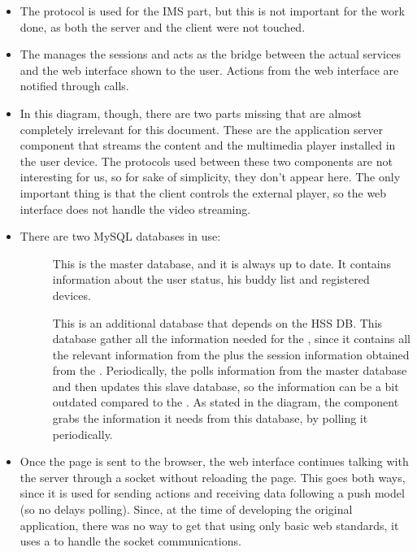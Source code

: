 \begin{itemize}
  \item The  protocol is used for the IMS part, but this is not important for the work done, as both the server and the client were not touched.
  \item The  manages the sessions and acts as the bridge between the actual services and the web interface shown to the user.
  Actions from the web interface are notified through  calls.
  \item In this diagram, though, there are two parts missing that are almost completely irrelevant for this document.
  These are the application server component that streams the content and the multimedia player installed in the user device.
  The protocols used between these two components are not interesting for us, so for sake of simplicity, they don't appear here.
  The only important thing is that the  client controls the external player, so the web interface does not handle the video streaming.
  \item There are two MySQL databases in use:
  \begin{description}
    \item[] This is the master database, and it is always up to date.
    It contains information about the user status, his buddy list and registered devices.
    \item[] This is an additional database that depends on the HSS DB.
    This database gather all the information needed for the , since it contains all the relevant information from the  plus the session information obtained from the .
    Periodically, the  polls information from the master database and then updates this slave database, so the information can be a bit outdated compared to the .
    As stated in the diagram, the  component grabs the information it needs from this database, by polling it periodically.
  \end{description}
  \item Once the page is sent to the browser, the web interface continues talking with the server through a  socket without reloading the page.
  This goes both ways, since it is used for sending actions and receiving data following a push model (so no delays polling).
  Since, at the time of developing the original application, there was no way to get that using only basic web standards, it uses a  to handle the socket communications.
\end{itemize}

